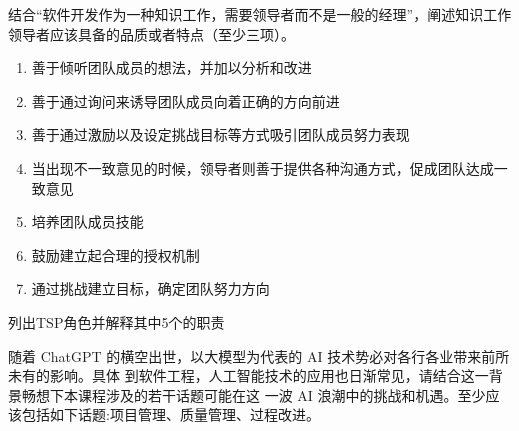\begin{problem}[2023]
结合“软件开发作为一种知识工作，需要领导者而不是一般的经理”，阐述知识工作领导者应该具备的品质或者特点（至少三项）。
\end{problem}

\begin{solution}
\begin{enumerate}[label=\arabic*.]
    \item 善于倾听团队成员的想法，并加以分析和改进
    \item 善于通过询问来诱导团队成员向着正确的方向前进
    \item 善于通过激励以及设定挑战目标等方式吸引团队成员努力表现
    \item 当出现不一致意见的时候，领导者则善于提供各种沟通方式，促成团队达成一致意见
    \item 培养团队成员技能
    \item 鼓励建立起合理的授权机制
    \item 通过挑战建立目标，确定团队努力方向
\end{enumerate}
\end{solution}



\begin{problem}[2021]
列出TSP角色并解释其中5个的职责
\end{problem}

\begin{solution}

\end{solution}


\begin{problem}[2023]
随着 ChatGPT 的横空出世，以大模型为代表的 AI 技术势必对各行各业带来前所未有的影响。具体 到软件工程，人工智能技术的应用也日渐常见，请结合这一背景畅想下本课程涉及的若干话题可能在这 一波 AI 浪潮中的挑战和机遇。至少应该包括如下话题:项目管理、质量管理、过程改进。
\end{problem}

